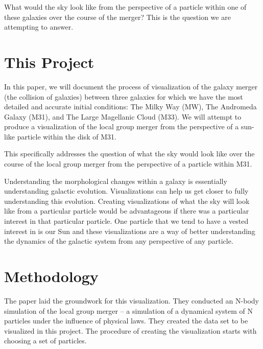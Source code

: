 \documentclass[twocolumn]{aastex63}
\begin{document}
What would the sky look like from the perspective of a particle within one of these galaxies over the course of the merger? This is the question we are attempting to answer. 

\section{This Project} \label{sec:style}

In this paper, we will document the process of visualization of the galaxy merger (the collision of galaxies) between three galaxies for which we have the most detailed and accurate initial conditions: The Milky Way (MW), The Andromeda Galaxy (M31), and The Large Magellanic Cloud (M33). We will attempt to produce a visualization of the local group merger from the perspective of a sun-like particle within the disk of M31. 

This specifically addresses the question of what the sky would look like over the course of the local group merger from the perspective of a particle within M31. 

Understanding the morphological changes within a galaxy is essentially understanding galactic evolution. Visualizations can help us get closer to fully understanding this evolution. Creating visualizations of what the sky will look like from a particular particle would be advantageous if there was a particular interest in that particular particle. One particle that we tend to have a vested interest in is our Sun and these visualizations are a way of better understanding the dynamics of the galactic system from any perspective of any particle. 


\section{Methodology} \label{sec:style}

The paper \cite{vdm12} laid the groundwork for this visualization. They conducted an N-body simulation of the local group merger -- a simulation of a dynamical system of N particles under the influence of physical laws. They created the data set to be visualized in this project. The procedure of creating the visualization starts with choosing a set of particles.
\end{document}
